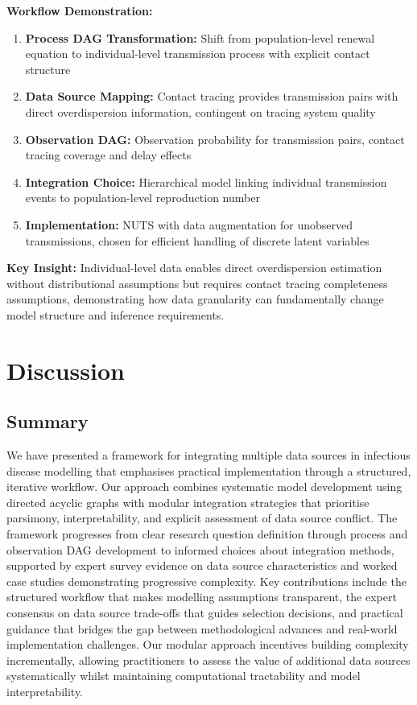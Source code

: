 \documentclass{article}
\begin{document}
\textbf{Workflow Demonstration:}
\begin{enumerate}
    \item \textbf{Process DAG Transformation:} Shift from population-level renewal equation to individual-level transmission process with explicit contact structure
    \item \textbf{Data Source Mapping:} Contact tracing provides transmission pairs with direct overdispersion information, contingent on tracing system quality
    \item \textbf{Observation DAG:} Observation probability for transmission pairs, contact tracing coverage and delay effects
    \item \textbf{Integration Choice:} Hierarchical model linking individual transmission events to population-level reproduction number
    \item \textbf{Implementation:} NUTS with data augmentation for unobserved transmissions, chosen for efficient handling of discrete latent variables
\end{enumerate}

\textbf{Key Insight:} Individual-level data enables direct overdispersion estimation without distributional assumptions but requires contact tracing completeness assumptions, demonstrating how data granularity can fundamentally change model structure and inference requirements.

\section{Discussion}

\subsection{Summary}

We have presented a framework for integrating multiple data sources in infectious disease modelling that emphasises practical implementation through a structured, iterative workflow.
Our approach combines systematic model development using directed acyclic graphs with modular integration strategies that prioritise parsimony, interpretability, and explicit assessment of data source conflict.
The framework progresses from clear research question definition through process and observation DAG development to informed choices about integration methods, supported by expert survey evidence on data source characteristics and worked case studies demonstrating progressive complexity.
Key contributions include the structured workflow that makes modelling assumptions transparent, the expert consensus on data source trade-offs that guides selection decisions, and practical guidance that bridges the gap between methodological advances and real-world implementation challenges.
Our modular approach incentives building complexity incrementally, allowing practitioners to assess the value of additional data sources systematically whilst maintaining computational tractability and model interpretability.
\end{document}
